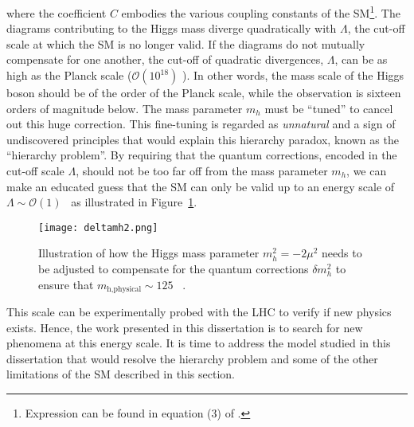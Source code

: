 where the coefficient $C$ embodies the various coupling constants of the SM\footnote{Expression can be found in equation (3) of \cite{Baer:2015fsa}.}.
The diagrams contributing to the Higgs mass diverge quadratically with $\Lambda$, the cut-off scale at which the SM is no longer valid.
If the diagrams do not mutually compensate for one another, the cut-off of quadratic divergences, $\Lambda$, can be as high as the Planck scale ($\mathcal{O}\left(10^{18}\right)$ \GeV).
In other words, the mass scale of the Higgs boson should be of the order of the Planck scale, while the observation is sixteen orders of magnitude below.
The mass parameter $m_h$ must be ``tuned'' to cancel out this huge correction.
This fine-tuning is regarded as \textit{unnatural} and a sign of undiscovered principles that would explain this hierarchy paradox, known as the ``hierarchy problem''.
By requiring that the quantum corrections, encoded in the cut-off scale $\Lambda$, should not be too far off from the mass parameter $m_h$, we can make an educated 
guess that the SM can only be valid up to an energy scale of $\Lambda \sim \mathcal{O}\left(1\right)$ \TeV~as illustrated in Figure~\ref{fig:theory.sm.deltamh2}.
\begin{figure}[htb!]
\centering
\texttt{[image: deltamh2.png]}
\caption{Illustration of how the Higgs mass parameter $m_h^2 = -2\mu^2$ needs to be adjusted to compensate for the quantum corrections $\delta m_h^2$ to ensure 
that $m_\text{h,physical} \sim 125$ \GeV~\cite{Bae:2015jea}.}
\label{fig:theory.sm.deltamh2}
\end{figure} 
This scale can be experimentally probed with the LHC to verify if new physics exists. Hence, the work presented in this dissertation is to search for new phenomena 
at this energy scale.
It is time to address the model studied in this dissertation that would resolve the hierarchy problem and some of the other limitations of the SM described in this section.
